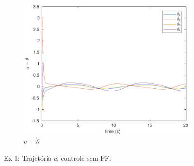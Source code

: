 \documentclass[a4paper,11pt]{article}
\theoremstyle{mytheor}
\begin{document}
\begin{figure}[!ht]
\begin{minipage}{\linewidth}
    \begin{subfigure}[b]{0.45\textwidth}
    \includegraphics[width=1\textwidth]{figs/ex1_c_2_dq.pdf}
    \caption{$u = \dot{\theta}$}
    \label{fig:ex1_c_2_dq}
    \end{subfigure}
  \end{minipage}
\caption{Ex 1: Trajetória $c$, controle sem FF.}
\label{fig:ex1_c_2}
\end{figure}
\end{document}
